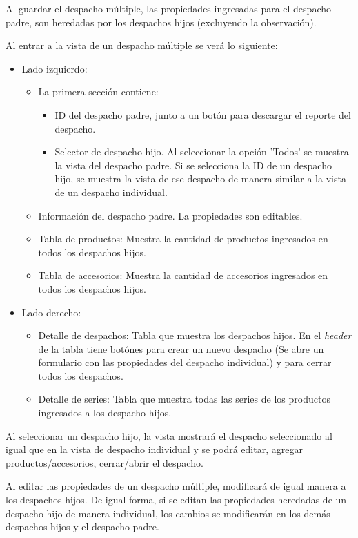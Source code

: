 Al guardar el despacho múltiple, las propiedades ingresadas para el despacho padre, son heredadas por los despachos hijos (excluyendo la observación).

Al entrar a la vista de un despacho múltiple se verá lo siguiente:

\begin{itemize}
    \item Lado izquierdo:
    \begin{itemize}
        \item La primera sección contiene:
        \begin{itemize}
            \item ID del despacho padre, junto a un botón para descargar el reporte del despacho.
            \item Selector de despacho hijo. Al seleccionar la opción 'Todos' se muestra la vista del despacho padre. Si se selecciona la ID de un despacho hijo, se muestra la vista de ese despacho de manera similar a la vista de un despacho individual.
        \end{itemize}
        \item Información del despacho padre. La propiedades son editables.
        \item Tabla de productos: Muestra la cantidad de productos ingresados en todos los despachos hijos.
        \item Tabla de accesorios: Muestra la cantidad de accesorios ingresados en todos los despachos hijos.
    \end{itemize}
    \item Lado derecho:
    \begin{itemize}
        \item Detalle de despachos: Tabla que muestra los despachos hijos. En el \textit{header} de la tabla tiene botónes para crear un nuevo despacho (Se abre un formulario con las propiedades del despacho individual) y para cerrar todos los despachos.
        \item Detalle de series: Tabla que muestra todas las series de los productos ingresados a los despacho hijos.
    \end{itemize}
\end{itemize}

Al seleccionar un despacho hijo, la vista mostrará el despacho seleccionado al igual que en la vista de despacho individual y se podrá editar, agregar productos/accesorios, cerrar/abrir el despacho.

Al editar las propiedades de un despacho múltiple, modificará de igual manera a los despachos hijos. De igual forma, si se editan las propiedades heredadas de un despacho hijo de manera individual, los cambios se modificarán en los demás despachos hijos y el despacho padre.

